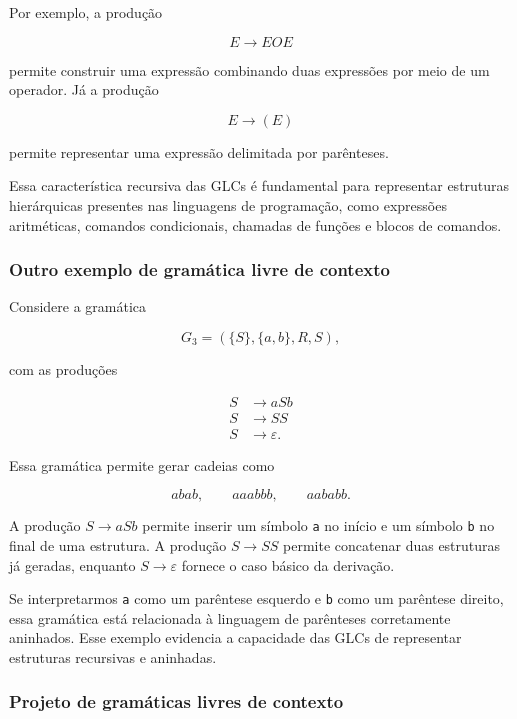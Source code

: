 \documentclass[
  brazilian,
  letterpaper,
]{book}
\theoremstyle{plain}
\theoremstyle{definition}
\theoremstyle{remark}
\begin{document}
Por exemplo, a produção

\[
E\rightarrow EOE
\]

permite construir uma expressão combinando duas expressões por meio de
um operador. Já a produção

\[
E\rightarrow(E)
\]

permite representar uma expressão delimitada por parênteses.

Essa característica recursiva das GLCs é fundamental para representar
estruturas hierárquicas presentes nas linguagens de programação, como
expressões aritméticas, comandos condicionais, chamadas de funções e
blocos de comandos.

\subsubsection{Outro exemplo de gramática livre de
contexto}\label{outro-exemplo-de-gramuxe1tica-livre-de-contexto}

Considere a gramática

\[
G_3=(\{S\},\{a,b\},R,S),
\]

com as produções

\[
\begin{aligned}
S &\rightarrow aSb\\
S &\rightarrow SS\\
S &\rightarrow \varepsilon.
\end{aligned}
\]

Essa gramática permite gerar cadeias como

\[
abab,\qquad aaabbb,\qquad aababb.
\]

A produção \(S\rightarrow aSb\) permite inserir um símbolo \texttt{a} no
início e um símbolo \texttt{b} no final de uma estrutura. A produção
\(S\rightarrow SS\) permite concatenar duas estruturas já geradas,
enquanto \(S\rightarrow\varepsilon\) fornece o caso básico da derivação.

Se interpretarmos \texttt{a} como um parêntese esquerdo e \texttt{b}
como um parêntese direito, essa gramática está relacionada à linguagem
de parênteses corretamente aninhados. Esse exemplo evidencia a
capacidade das GLCs de representar estruturas recursivas e aninhadas.

\subsubsection{Projeto de gramáticas livres de
contexto}\label{projeto-de-gramuxe1ticas-livres-de-contexto}
\end{document}
